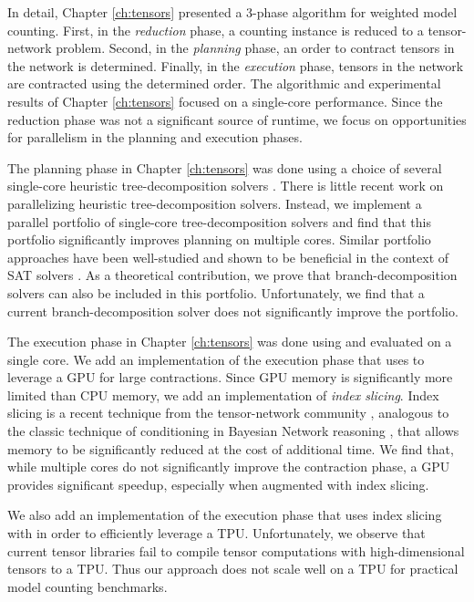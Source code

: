 In detail, Chapter \ref{ch:tensors} presented a 3-phase algorithm for weighted model counting. First, in the \emph{reduction} phase, a counting instance is reduced to a tensor-network problem. Second, in the \emph{planning} phase, an order to contract tensors in the network is determined. Finally, in the \emph{execution} phase, tensors in the network are contracted using the determined order. The algorithmic and experimental results of Chapter \ref{ch:tensors} focused on a single-core performance.  Since the reduction phase was not a significant source of runtime, we focus on opportunities for parallelism in the planning and execution phases.

The planning phase in Chapter \ref{ch:tensors} was done using a choice of several single-core heuristic tree-decomposition solvers \cite{AMW17,HS18,Tamaki17}. There is little recent work on parallelizing heuristic tree-decomposition solvers. Instead, we implement a parallel portfolio of single-core tree-decomposition solvers and find that this portfolio significantly improves planning on multiple cores. Similar portfolio approaches have been well-studied and shown to be beneficial in the context of SAT solvers \cite{BSS15,XHHL08}. As a theoretical contribution, we prove that branch-decomposition solvers can also be included in this portfolio. Unfortunately, we find that a current branch-decomposition solver does not significantly improve the portfolio.

The execution phase in Chapter \ref{ch:tensors} was done using  \cite{numpy} and evaluated on a single core. We add an implementation of the execution phase that uses  \cite{ABCCDDDGII16} to leverage a GPU for large contractions. Since GPU memory is significantly more limited than CPU memory, we add an implementation of \emph{index slicing}. Index slicing is a recent technique from the tensor-network community \cite{CZHNS18,GK20,VBNHRBM19}, analogous to the classic technique of conditioning in Bayesian Network reasoning \cite{darwiche01,dechter99,pearl86,SAS94}, that allows memory to be significantly reduced at the cost of additional time. We find that, while multiple cores do not significantly improve the contraction phase, a GPU provides significant speedup, especially when augmented with index slicing. 

We also add an implementation of the execution phase that uses index slicing with  \cite{jax2018github} in order to efficiently leverage a TPU. 
Unfortunately, we observe that current tensor libraries fail to compile tensor computations with high-dimensional tensors to a TPU.
Thus our approach does not scale well on a TPU for practical model counting benchmarks.

